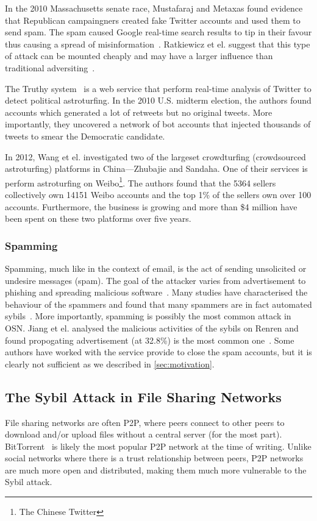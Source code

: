 In the 2010 Massachusetts senate race, Mustafaraj and Metaxas found evidence
that Republican campaingners created fake Twitter accounts and used them to send
spam. The spam caused Google real-time search results to tip in their favour
thus causing a spread of misinformation~\cite{mustafaraj2010obscurity}.
Ratkiewicz et el. suggest that this type of attack can be mounted cheaply and
may have a larger influence than traditional
adversiting~\cite{ratkiewicz2011truthy}.

The Truthy system~\cite{ratkiewicz2011truthy} is a web service that perform
real-time analysis of Twitter to detect political astroturfing. In the 2010
U.S. midterm election, the authors found accounts which generated a lot of
retweets but no original tweets. More importantly, they uncovered a network of
bot accounts that injected thousands of tweets to smear the Democratic candidate.

In 2012, Wang et el. investigated two of the largeset crowdturfing (crowdsourced
astroturfing) platforms in China---Zhubajie and Sandaha. One of their services
is perform astroturfing on Weibo\footnote{The Chinese Twitter}. The authors
found that the 5364 sellers collectively own 14151 Weibo accounts and the top
1\% of the sellers own over 100 accounts. Furthermore, the business is growing
and more than \$4 million have been spent on these two platforms over five
years\cite{wang2012serf}.

\subsubsection{Spamming}
Spamming, much like in the context of email, is the act of sending unsolicited
or undesire messages (spam). The goal of the attacker varies from advertisement
to phishing and spreading malicious software~\cite{twittermalware1,
  twittermalware2}. Many studies have characterised the behaviour of the
spammers and found that many spammers are in fact automated
sybils~\cite{stringhini2010detecting, yang2012analyzing, grier2010spam,
  jiang2015understanding}. More importantly, spamming is possibly the most
common attack in OSN. Jiang et el. analysed the malicious activities of the
sybils on Renren and found propogating advertisement (at 32.8\%) is the most
common one~\cite{jiang2015understanding}. Some authors have worked with the
service provide to close the spam accounts, but it is clearly not sufficient as
we described in \autoref{sec:motivation}.


\subsection{The Sybil Attack in File Sharing Networks}
File sharing networks are often P2P, where peers connect to other peers to
download and/or upload files without a central server (for the most part).
BitTorrent~\cite{bep3} is likely the most popular P2P network at the time of
writing. Unlike social networks where there is a trust relationship between
peers, P2P networks are much more open and distributed, making them much more
vulnerable to the Sybil attack.

